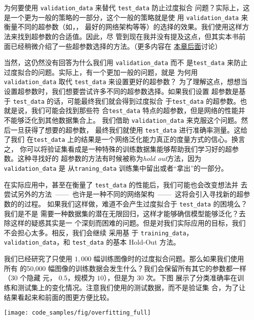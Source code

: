 \label{validation_explanation}
为何要使用 \lstinline!validation_data! 来替代 \lstinline!test_data! 防止过度拟合
问题？实际上，这是一个更为一般的策略的一部分，这个一般的策略就是使
用 \lstinline!validation_data! 来衡量不同的超参数（如\epochs{}，\learningrate{}，
最好的网络架构等等）的选择的效果。我们使用这样方法来找到超参数的合适值。因此，尽
管到现在我并没有提及这点，但其实本书前面已经稍微介绍了一些超参数选择的方法。（更多内容在%
\hyperref[sec:how_to_choose_a_neural_network's_hyper-parameters]{本章后面}讨论）

当然，这仍然没有回答为什么我们用 \lstinline!validation_data! 而不
是\lstinline!test_data! 来防止过度拟合的问题。实际上，有一个更加一般的问题，就是
为何用 \lstinline!validation_data! 取代 \lstinline!test_data! 来设置更好的超参数？
为了理解这点，想想当设置超参数时，我们想要尝试许多不同的超参数选择。如果我们设置
超参数是基于 \lstinline!test_data! 的话，可能最终我们就会得到过度拟合
于\lstinline!test_data!  的超参数。也就是说，我们可能会找到那些符
合\lstinline!test_data! 特点的超参数，但是网络的性能并不能够泛化到其他数据集合上。
我们借助 \lstinline!validation_data! 来克服这个问题。然后一旦获得了想要的超参数，
最终我们就使用 \lstinline!test_data! 进行准确率测量。这给了我们
在\lstinline!test_data! 上的结果是一个网络泛化能力真正的度量方式的信心。换言之，
你可以将验证集看成是一种特殊的训练数据集能够帮助我们学习好的超参数。这种寻找好的
超参数的方法有时候被称为\emph{hold out}方法，因为 \lstinline!validation_data! 是
从\lstinline!traning_data! 训练集中留出或者“拿出”的一部分。

在实际应用中，甚至在衡量了 \lstinline!test_data! 的性能后，我们可能也会改变想法并
去尝试另外的方法~——~也许是一种不同的网络架构~——~这将会引入寻找新的超参数的的过程。
如果我们这样做，难道不会产生过度拟合于 \lstinline!test_data! 的困境么？我们是不是
需要一种数据集的潜在无限回归，这样才能够确信模型能够泛化？去除这样的疑惑其实是一
个深刻而困难的问题。但是对我们实际应用的目标，我们不会担心太多。相反，我们会继续
采用基
于 \lstinline!training_data!，\lstinline!validation_data!，和
\lstinline!test_data! 的基本 Hold-Out 方法。

我们已经研究了只使用 $1,000$ 幅训练图像时的过度拟合问题。那么如果我们使用所有
的50,000 幅图像的训练数据会发生什么？我们会保留所有其它的参数都一样（$30$ 个隐藏
元，\learningrate{} $0.5$，\minibatch{}规模为 $10$），但是\epochs{}为 30 次。下图
展示了分类准确率在训练和测试集上的变化情况。注意我们使用的测试数据，而不是验证集
合，为了让结果看起来和前面的图更方便比较。
\begin{center}
  \texttt{[image: code\_samples/fig/overfitting\_full]}
\end{center}

